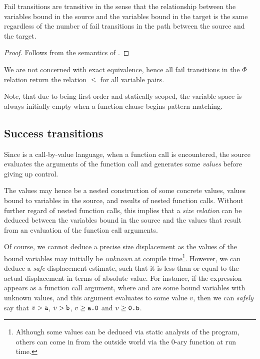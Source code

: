\begin{lemma} Fail transitions are transitive in the sense that the
relationship between the variables bound in the source and the variables bound
in the target is the same regardless of the number of fail transitions in
the path between the source and the target.\end{lemma}

\begin{proof} Follows from the semantics of \D{}. \end{proof}

We are not concerned with exact equivalence, hence all fail transitions in the
$\Phi$ relation return the relation $\leq$ for all variable pairs.

Note, that due to \D{} being first order and statically scoped, the variable
space is always initially empty when a function clause begins pattern matching.

\subsection{Success transitions}

Since \D{} is a call-by-value language, when a function call is encountered,
the source evaluates the arguments of the function call and generates some
\emph{values} before giving up control.

The values may hence be a nested construction of some concrete values, values
bound to variables in the source, and results of nested function calls. Without
further regard of nested function calls, this implies that a \emph{size
relation} can be deduced between the variables bound in the source and the
values that result from an evaluation of the function call arguments. 

Of course, we cannot deduce a precise size displacement as the values of the
bound variables may initially be \emph{unknown} at compile
time\footnote{Although some values can be deduced via static analysis of the
program, others can come in from the outside world via the 0-ary function
 at run time.}.  However, we can deduce a \emph{safe} displacement
estimate, such that it is less than or equal to the actual displacement in
terms of absolute value. For instance, if the expression  appears as
a function call argument, where  and  are some bound variables
with unknown values, and this argument evaluates to some value $v$, then we can
\emph{safely} say that $v>\text{{\ttfamily a}}$, $v>\text{{\ttfamily b}}$,
$v\geq\text{{\ttfamily a.0}}$ and $v\geq\text{{\ttfamily0.b}}$.

